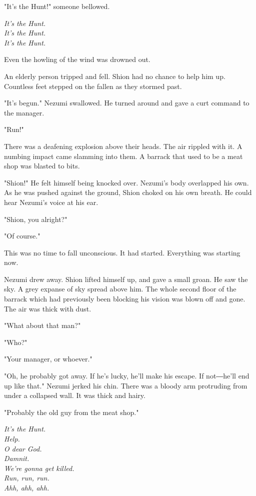 "It's the Hunt!" someone bellowed.

\myspace

\emph{It's the Hunt.\\
It's the Hunt.\\
It's the Hunt.}

\myspace

Even the howling of the wind was drowned out.

An elderly person tripped and fell. Shion had no chance to help him up.
Countless feet stepped on the fallen as they stormed past.

"It's begun." Nezumi swallowed. He turned around and gave a curt command
to the manager.

"Run!"

There was a deafening explosion above their heads. The air rippled with
it. A numbing impact came slamming into them. A barrack that used to be
a meat shop was blasted to bits.

"Shion!" He felt himself being knocked over. Nezumi's body overlapped
his own. As he was pushed against the ground, Shion choked on his own
breath. He could hear Nezumi's voice at his ear.

"Shion, you alright?"

"Of course."

This was no time to fall unconscious. It had started. Everything was
starting now.

Nezumi drew away. Shion lifted himself up, and gave a small groan. He
saw the sky. A grey expanse of sky spread above him. The whole second
floor of the barrack which had previously been blocking his vision was
blown off and gone. The air was thick with dust.

"What about that man?"

"Who?"

"Your manager, or whoever."

"Oh, he probably got away. If he's lucky, he'll make his escape. If
not―he'll end up like that." Nezumi jerked his chin. There was a bloody
arm protruding from under a collapsed wall. It was thick and hairy.

"Probably the old guy from the meat shop."

\myspace

\emph{It's the Hunt.\\
	Help.\\
	O dear God.\\
	Damnit.\\
	We're gonna get killed.\\
	Run, run, run.\\
	Ahh, ahh, ahh.}

